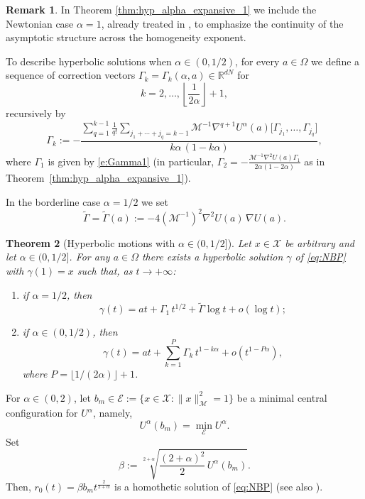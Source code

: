 \documentclass[a4paper,10pt]{amsart}
\theoremstyle{plain}
\newtheorem{thm}{Theorem}
\theoremstyle{definition}
\newtheorem{rem}[thm]{Remark}
\numberwithin{equation}{section}
\numberwithin{thm}{section}
\begin{document}
\begin{rem}
In Theorem \ref{thm:hyp_alpha_expansive_1} we include the Newtonian case $\alpha=1$, already treated in \cite{PolimeniTerracini}, to emphasize the continuity of the asymptotic structure across the homogeneity exponent.
\end{rem}

To describe hyperbolic solutions when $\alpha\in(0,1/2)$, for every $a\in\Omega$ we define a sequence of correction vectors $\Gamma_k=\Gamma_k(\alpha,a)\in\mathbb{R}^{dN}$ for
\[
k=2,\dots,\left\lfloor\frac{1}{2\alpha}\right\rfloor+1,
\]
recursively by
\begin{equation}\label{eq:gamma_k}
\Gamma_k
:=
-\frac{
\displaystyle
\sum_{q=1}^{k-1}\frac{1}{q!}
\sum_{j_1+\cdots+j_q=k-1}
\mathcal{M}^{-1}\nabla^{q+1}U^\alpha(a)\big[\Gamma_{j_1},\dots,\Gamma_{j_q}\big]
}{
k\alpha\,(1-k\alpha)
},
\end{equation}
where $\Gamma_1$ is given by \eqref{e:Gamma1} (in particular, $\Gamma_2=-\frac{\mathcal{M}^{-1}\nabla^2U(a)\Gamma_1}{2\alpha(1-2\alpha)}$ as in Theorem~\ref{thm:hyp_alpha_expansive_1}).

In the borderline case $\alpha=1/2$ we set
\[
\widetilde\Gamma=\widetilde\Gamma(a):=-4(\mathcal{M}^{-1})^2\nabla^2U(a)\,\nabla U(a).
\]

\begin{thm}[Hyperbolic motions with {$\alpha\in(0,1/2]$}]
\label{thm:hyp_alpha_expansive_2}
Let $x\in\mathcal{X}$ be arbitrary and let $\alpha\in(0,1/2]$. For any $a\in\Omega$ there exists a hyperbolic solution $\gamma$ of \eqref{eq:NBP} with $\gamma(1)=x$ such that, as $t\rightarrow+\infty$:
\begin{enumerate}
\item if $\alpha=1/2$, then
\begin{equation}\label{eq:hyp_small_alpha_2}
\gamma(t)=at+\Gamma_1\,t^{1/2}+\widetilde\Gamma\log t+o(\log t);
\end{equation}
\item if $\alpha\in(0,1/2)$, then
\begin{equation}\label{eq:hyp_small_alpha_1}
\gamma(t)
=
at+\sum_{k=1}^{P}\Gamma_k\,t^{1-k\alpha}+o\!\left(t^{1-P\alpha}\right),
\end{equation}
where $P=\lfloor 1/(2\alpha)\rfloor+1$.
\end{enumerate}
\end{thm}

\medskip

For $\alpha\in(0,2)$, let $b_m\in\mathcal{E}:=\{x\in\mathcal{X}:\|x\|_{\mathcal{M}}^2=1\}$ be a minimal central configuration for $U^\alpha$, namely,
\[
U^\alpha(b_m)=\min_{\mathcal{E}}U^\alpha.
\]
Set
\begin{equation}\label{e:beta}
\beta:=\sqrt[2+\alpha]{\frac{(2+\alpha)^2}{2}\,U^\alpha(b_m)}.
\end{equation}
Then, $r_0(t)=\beta b_m t^{\frac{2}{2+\alpha}}$ is a homothetic solution of \eqref{eq:NBP} (see also \cite{BarutelloFerrarioTerracini2008}).
\end{document}
